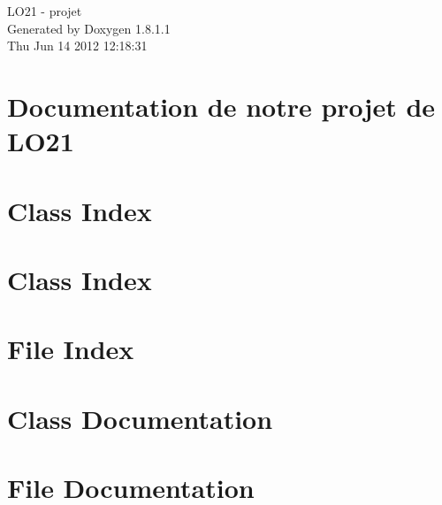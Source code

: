 \documentclass{book}
\begin{document}
\hypersetup{pageanchor=false,citecolor=blue}
\begin{titlepage}
\vspace*{7cm}
\begin{center}
{\Large L\-O21 -\/ projet }\\
\vspace*{1cm}
{\large Generated by Doxygen 1.8.1.1}\\
\vspace*{0.5cm}
{\small Thu Jun 14 2012 12:18:31}\\
\end{center}
\end{titlepage}
\clearemptydoublepage
{}
\tableofcontents
\clearemptydoublepage
{}
\hypersetup{pageanchor=true,citecolor=blue}
\chapter{Documentation de notre projet de L\-O21}
\label{index}\hypertarget{index}{}
\chapter{Class Index}

\chapter{Class Index}

\chapter{File Index}

\chapter{Class Documentation}
















\chapter{File Documentation}






\printindex
\end{document}
